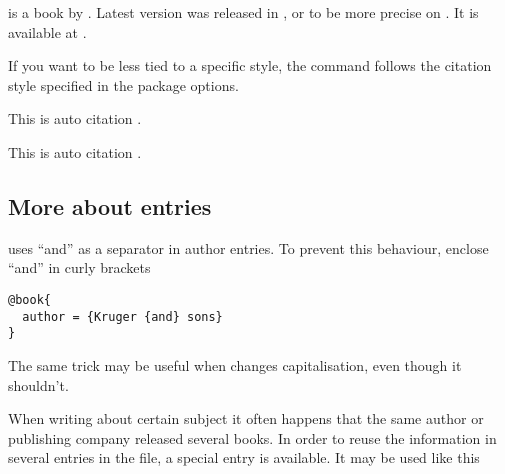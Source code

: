 \begin{example}[standalone,
  biber,
  biber_dir=../src/examples/,
  paperwidth=5cm,
  paperheight=4cm,
]
\usepackage{biblatex}

\sloppy

\noindent
 is a book by
\citeauthor{lshort}. Latest version was
released in \citeyear{lshort}, or to
be more precise on . It
is available at .

\end{example}

If you want to be less tied to a specific style, the 
command follows the citation style specified in the package options.

\begin{example}[standalone,
  biber,
  biber_dir=../src/examples/,
  paperwidth=5cm,
  paperheight=4cm,
]
\usepackage[
  style=verbose,
  autocite=footnote,
]{biblatex}



\sloppy

\noindent
This is auto citation \autocite{curie}.

\end{example}

\begin{example}[standalone,
  biber,
  biber_dir=../src/examples/,
  paperwidth=5cm,
  paperheight=2cm,
]
\usepackage[
  style=authoryear,
  autocite=inline,
]{biblatex}


\sloppy

\noindent
This is auto citation \autocite{curie}.

\end{example}

\subsection{More about entries}

 uses ``and'' as a separator in author entries. To prevent
this behaviour, enclose ``and'' in curly brackets
\begin{verbatim}
@book{
  author = {Kruger {and} sons}
}
\end{verbatim}
The same trick may be useful when  changes capitalisation, even
though it shouldn't.

When writing about certain subject it often happens that the same author or
publishing company released several books. In order to reuse the information in
several entries in the  file, a special entry  is available. It may be used
like this

